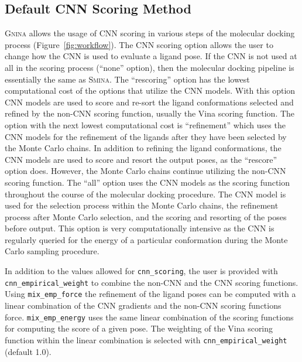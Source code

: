\documentclass[journal=jcisd8,manuscript=article]{achemso}
\begin{document}
\subsection{Default CNN Scoring Method}
\textsc{Gnina} allows the usage of CNN scoring in various steps of the molecular docking process (Figure~\ref{fig:workflow}). The CNN scoring option allows the user to change how the CNN is used to evaluate a ligand pose. If the CNN is not used at all in the scoring process (``none'' option), then the molecular docking pipeline is essentially the same as \textsc{Smina}. The ``rescoring'' option has the lowest computational cost of the options that utilize the CNN models. With this option CNN models are used to score and re-sort the ligand conformations selected and refined by the non-CNN scoring function, usually the Vina scoring function. The option with the next lowest computational cost is ``refinement'' which uses the CNN models for the refinement of the ligands after they have been selected by the Monte Carlo chains. In addition to refining the ligand conformations, the CNN models are used to score and resort the output poses, as the ``rescore'' option does. However, the Monte Carlo chains continue utilizing the non-CNN scoring function. The ``all'' option uses the CNN models as the scoring function throughout the course of the molecular docking procedure. The CNN model is used for the selection process within the Monte Carlo chains, the refinement process after Monte Carlo selection, and the scoring and resorting of the poses before output. This option is very computationally intensive as the CNN is regularly queried for the energy of a particular conformation during the Monte Carlo sampling procedure.

In addition to the values allowed for \texttt{cnn\_scoring}, the user is provided with \texttt{cnn\_empirical\_weight} to combine the non-CNN and the CNN scoring functions. Using \texttt{mix\_emp\_force} the refinement of the ligand poses can be computed with a linear combination of the CNN gradients and the non-CNN scoring functions force. \texttt{mix\_emp\_energy} uses the same linear combination of the scoring functions for computing the score of a given pose. The weighting of the Vina scoring function within the linear combination is selected with \texttt{cnn\_empirical\_weight} (default 1.0). 
\end{document}
